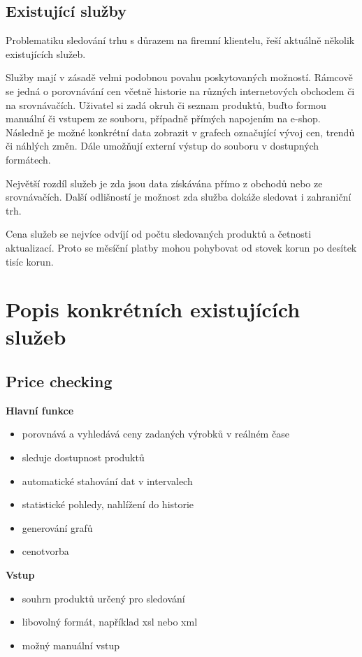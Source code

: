 \documentclass[thesis=B,czech]{FITthesis}[2012/06/26]
\begin{document}
\subsection{Existující služby}

Problematiku sledování trhu s důrazem na firemní klientelu, řeší aktuálně několik existujících služeb.
\par
Služby mají v zásadě velmi podobnou povahu poskytovaných možností. Rámcově se jedná o porovnávání cen včetně historie na různých internetových
obchodem či na srovnávačích. Uživatel si zadá okruh či seznam produktů, buďto formou manuální či vstupem ze souboru, případně 
přímých napojením na e-shop. Následně je možné konkrétní data zobrazit v grafech označující vývoj cen, trendů či náhlých změn.
Dále umožňují externí výstup do souboru v dostupných formátech.
\par
Největší rozdíl služeb je zda jsou data získávána přímo z obchodů nebo ze srovnávačích. Další odlišností je 
možnost zda služba dokáže sledovat i zahraniční trh.
\par
Cena služeb se nejvíce odvíjí od počtu sledovaných produktů a četnosti aktualizací. Proto se měsíční platby mohou 
pohybovat od stovek korun po desítek tisíc korun.

\section{Popis konkrétních existujících služeb}

\subsection{Price checking\cite{priceChecking}} 


\textbf{Hlavní funkce}
\begin{itemize}
\item porovnává a vyhledává ceny zadaných výrobků v reálném čase
\item sleduje dostupnost produktů
\item automatické stahování dat v intervalech
\item statistické pohledy, nahlížení do historie
\item generování grafů
\item cenotvorba
\end{itemize}

\textbf{Vstup}
\begin{itemize}
\item souhrn produktů určený pro sledování
\item libovolný formát, například xsl nebo xml
\item možný manuální vstup
\end{itemize}
\end{document}
